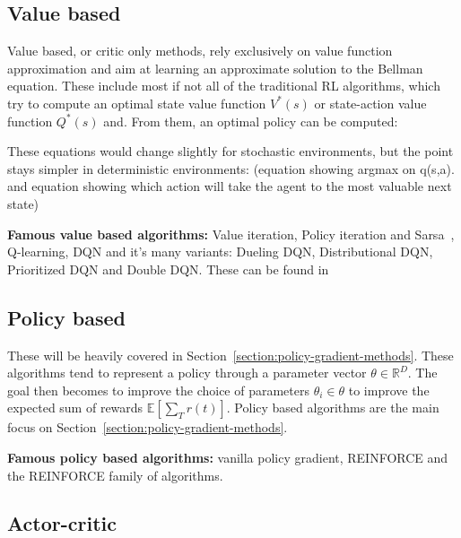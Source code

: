 \documentclass{../main.tex}{}
\begin{document}
\subsection{Value based}
Value based, or critic only methods, rely exclusively on value function approximation and aim at learning an approximate solution to the Bellman equation. These include most if not all of the traditional RL algorithms, which try to compute an optimal state value function $V^*(s)$ or state-action value function $Q^*(s)$ and. From them, an optimal policy can be computed:

These equations would change slightly for stochastic environments, but the point stays simpler in deterministic environments:
(equation showing argmax on q(s,a). and equation showing which action will take the agent to the most valuable next state)

\textbf{Famous value based algorithms:} Value iteration, Policy iteration and Sarsa~\cite{Sutton1998}, Q-learning, DQN and it's many variants: Dueling DQN, Distributional DQN, Prioritized DQN and Double DQN\@. These can be found in~\citep{Hessel2017}

\subsection{Policy based}
These will be heavily covered in Section~\ref{section:policy-gradient-methods}. These algorithms tend to represent a policy through a parameter vector $\theta
\in \mathbb{R}^D$. The goal then becomes to improve the choice of parameters
$\theta_i \in \theta$ to improve the expected sum of rewards
$\mathbb{E}[\sum_{T} r(t)]$. Policy based algorithms are the main focus on Section~\ref{section:policy-gradient-methods}.

\textbf{Famous policy based algorithms:} vanilla policy gradient, REINFORCE\citep{Williams1992} and the REINFORCE family of algorithms\@.

\subsection{Actor-critic}
\end{document}
